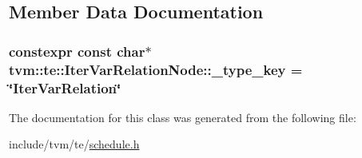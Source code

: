 \subsection{Member Data Documentation}
\subsubsection[{\texorpdfstring{\+\_\+type\+\_\+key}{_type_key}}]{\setlength{\rightskip}{0pt plus 5cm}constexpr const char$\ast$ tvm\+::te\+::\+Iter\+Var\+Relation\+Node\+::\+\_\+type\+\_\+key = \char`\"{}Iter\+Var\+Relation\char`\"{}\hspace{0.3cm}{\ttfamily [static]}}\hypertarget{classtvm_1_1te_1_1IterVarRelationNode_a5cd9f686b3aae26c63737f3532c2a164}{}\label{classtvm_1_1te_1_1IterVarRelationNode_a5cd9f686b3aae26c63737f3532c2a164}


The documentation for this class was generated from the following file\+:\begin{DoxyCompactItemize}
\item 
include/tvm/te/\hyperlink{schedule_8h}{schedule.\+h}\end{DoxyCompactItemize}
